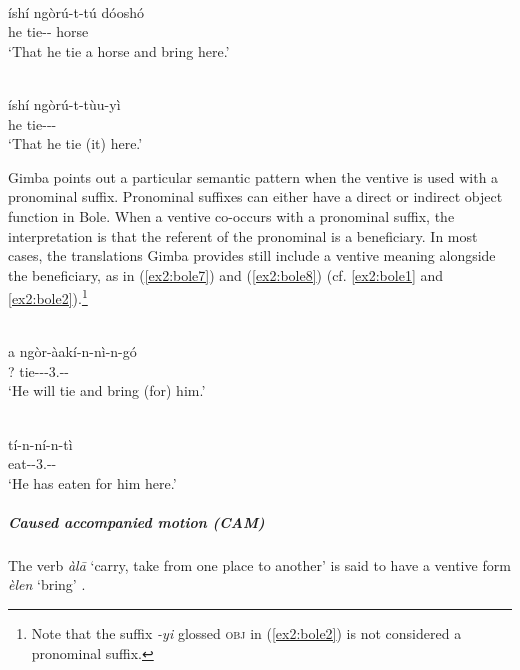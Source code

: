 \ea\label{ex2:bole1}
 \\
\gll íshí	ngòrú-t-tú	dóoshó \\
he	tie--	horse \\
\glt `That he tie a horse and bring here.'

\ex\label{ex2:bole2}
 \\
\gll íshí	ngòrú-t-tùu-yì \\
he	tie--- \\
\glt `That he tie (it) here.'
\z 

Gimba points out a particular semantic pattern when the ventive is used with a pronominal suffix. Pronominal suffixes can either have a direct or indirect object function in Bole. When a ventive co-occurs with a pronominal suffix, the interpretation is that the referent of the pronominal is a beneficiary. In most cases, the translations Gimba provides still include a ventive meaning alongside the beneficiary, as in (\ref{ex2:bole7}) and (\ref{ex2:bole8}) (cf. \ref{ex2:bole1} and \ref{ex2:bole2}).\footnote{Note that the suffix \textit{-yi} glossed \textsc{obj} in (\ref{ex2:bole2}) is not considered a pronominal suffix.}

\ea\label{ex2:bole7}
 \\
\gll  a	ngòr-àakí-n-nì-n-gó \\
?	tie---3.-- \\
\glt `He will tie and bring (for) him.'

\ex\label{ex2:bole8}
 \\
\gll tí-n-ní-n-tì \\
eat--3.-- \\
\glt `He has eaten for him here.'
\z 

\subparagraph{Caused accompanied motion (CAM)}



The verb \textit{àlā} `carry, take from one place to another' is said to have a ventive form \textit{èlen} `bring' \citep{gimbaBoleenglishhausaDictionaryAlhaji2004}.


